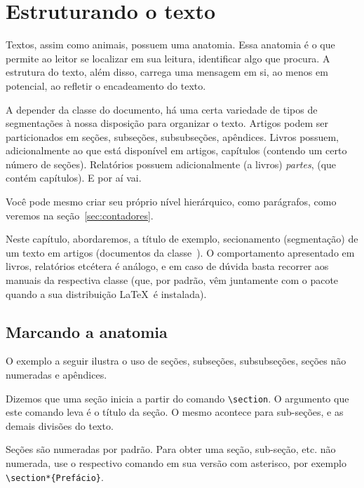 \section{Estruturando o texto}

Textos, assim como animais, possuem uma anatomia. Essa anatomia é o que permite ao leitor se localizar em sua leitura, identificar algo que procura. A estrutura do texto, além disso, carrega uma mensagem em si, ao menos em potencial, ao refletir o encadeamento do texto.

A depender da classe do documento, há uma certa variedade de tipos de segmentações à nossa disposição para organizar o texto.
Artigos podem ser particionados em seções, subseções, subsubseções, apêndices.
Livros possuem, adicionalmente ao que está disponível em artigos, capítulos (contendo um certo número de seções).
Relatórios possuem adicionalmente (a livros) \emph{partes}, (que contém capítulos).
E por aí vai.

Você pode mesmo criar seu próprio nível hierárquico, como parágrafos, como veremos na seção~\ref{sec:contadores}.

Neste capítulo, abordaremos, a título de exemplo, secionamento (segmentação) de um texto em artigos (documentos da classe~). O comportamento apresentado em livros, relatórios etcétera é análogo, e em caso de dúvida basta recorrer aos manuais da respectiva classe (que, por padrão, vêm juntamente com o pacote quando a sua distribuição \LaTeX\ é instalada).

\subsection{Marcando a anatomia}\label{sec:comandos-de-secionamento}

O exemplo a seguir ilustra o uso de seções, subseções, subsubseções, seções não numeradas e apêndices.


\medskip
{\footnotesize}

\medskip

Dizemos que uma seção inicia a partir do comando \verb'\section'. O
argumento que este comando leva é o título da seção. O mesmo acontece
para sub-seções, e as demais divisões do texto.

Seções são numeradas por padrão. Para obter uma seção, sub-seção, etc. não numerada,
use o respectivo comando em sua versão com asterisco, por
exemplo \verb'\section*{Prefácio}'.

